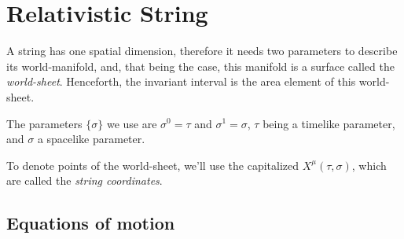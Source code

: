 \documentclass[oneside, 12pt]{book}
\begin{document}
\chapter{Relativistic String}

A string has one spatial dimension, therefore it needs two parameters to describe its world-manifold, and, that being the case, this manifold is a surface called the \textit{world-sheet}. Henceforth, the invariant interval is the area element of this world-sheet.\par
The parameters \(\{ \sigma\}\) we use are \(\sigma^0 = \tau\) and \(\sigma^1 = \sigma\), \(\tau\) being a timelike parameter, and \(\sigma\) a spacelike parameter.\par 
To denote points of the world-sheet, we'll use the capitalized \(X^{\mu}(\tau,\sigma)\), which are called the \textit{string coordinates}.\par

\section{Equations of motion}
\end{document}
